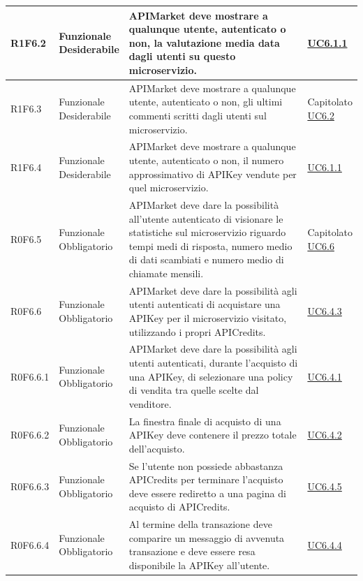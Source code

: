 \documentclass[12pt,a4paper,titlepage]{article}
\newcommand{\minitab}[2][1]{\begin{tabular}#1 #2\end{tabular}}
\newcommand{\uc}[1]{\hyperref[UC#1]{UC#1}}
\begin{document}
{\begin{longtable}{|m{5em}|m{6em}|m{28em}|m{5em}|}
			\hline
			R1F6.2 & \minitab[c]{Funzionale\\Desiderabile} &APIMarket deve mostrare a qualunque utente, autenticato o non, la valutazione media data dagli utenti su questo microservizio. & \uc{6.1.1}\\
			\hline
			R1F6.3 & \minitab[c]{Funzionale\\Desiderabile} & APIMarket deve mostrare  a qualunque utente, autenticato o non, gli ultimi commenti scritti dagli utenti sul microservizio. & \shortstack[l]{Capitolato\\\uc{6.2}}\\
			\hline
			R1F6.4 & \minitab[c]{Funzionale\\Desiderabile} & APIMarket deve mostrare  a qualunque utente, autenticato o non, il numero approssimativo di APIKey vendute per quel microservizio. & \uc{6.1.1}\\
			\hline
			R0F6.5 & \minitab[c]{Funzionale\\Obbligatorio} & APIMarket deve dare la possibilità all'utente autenticato di visionare le statistiche sul microservizio riguardo tempi medi di risposta, numero medio di dati scambiati e numero medio di chiamate mensili. & \shortstack[l]{Capitolato\\\uc{6.6}}\\
			\hline
			R0F6.6 & \minitab[c]{Funzionale\\Obbligatorio} & APIMarket deve dare la possibilità agli utenti autenticati di acquistare una APIKey per il microservizio visitato, utilizzando i propri APICredits. & \uc{6.4.3}\\
			\hline
			R0F6.6.1 & \minitab[c]{Funzionale\\Obbligatorio} & APIMarket deve dare la possibilità agli utenti autenticati, durante l'acquisto di una APIKey, di selezionare una policy di vendita tra quelle scelte dal venditore. & \uc{6.4.1}\\
			\hline
			R0F6.6.2 & \minitab[c]{Funzionale\\Obbligatorio} & La finestra finale di acquisto di una APIKey deve contenere il prezzo totale dell'acquisto. & \uc{6.4.2}\\
			\hline
			R0F6.6.3 & \minitab[c]{Funzionale\\Obbligatorio} & Se l'utente non possiede abbastanza APICredits per terminare l'acquisto deve essere rediretto a una pagina di acquisto di APICredits. & \uc{6.4.5}\\
			\hline
			R0F6.6.4 & \minitab[c]{Funzionale\\Obbligatorio} & Al termine della transazione deve comparire un messaggio di avvenuta transazione e deve essere resa disponibile la APIKey all'utente. & \uc{6.4.4}\\

\end{longtable}}
\end{document}
